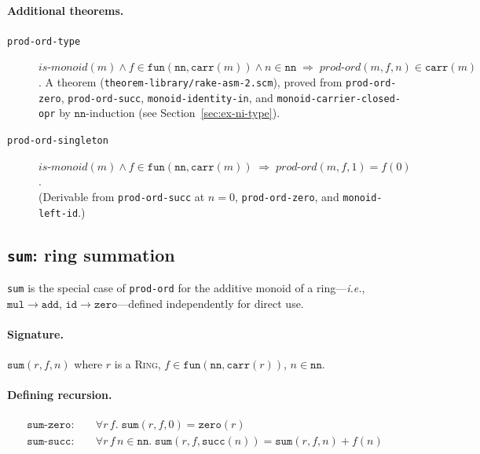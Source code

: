 \paragraph{Additional theorems.}
\begin{description}
\item[\texttt{prod-ord-type}]
  $\mathit{is\text{-}monoid}(m) \wedge f \in \mathtt{fun}(\mathtt{nn}, \mathtt{carr}(m))
  \wedge n \in \mathtt{nn} \;\Rightarrow\;
  \mathit{prod\text{-}ord}(m, f, n) \in \mathtt{carr}(m)$.
  A theorem (\texttt{theorem-library/rake-asm-2.scm}), proved from
  \texttt{prod-ord-zero}, \texttt{prod-ord-succ}, \texttt{monoid-identity-in},
  and \texttt{monoid-carrier-closed-opr} by $\mathtt{nn}$-induction
  (see Section~\ref{sec:ex-ni-type}).

\item[\texttt{prod-ord-singleton}]
  $\mathit{is\text{-}monoid}(m) \wedge f \in \mathtt{fun}(\mathtt{nn}, \mathtt{carr}(m))
  \;\Rightarrow\; \mathit{prod\text{-}ord}(m, f, 1) = f(0)$.\\
  (Derivable from \texttt{prod-ord-succ} at $n=0$, \texttt{prod-ord-zero},
  and \texttt{monoid-left-id}.)
\end{description}

\subsection{\texttt{sum}: ring summation}

\texttt{sum} is the special case of \texttt{prod-ord} for the additive
monoid of a ring---\textit{i.e.}, $\mathtt{mul} \to \mathtt{add}$,
$\mathtt{id} \to \mathtt{zero}$---defined independently for direct use.

\paragraph{Signature.}
$\mathtt{sum}(r, f, n)$ where $r$ is a \textsc{Ring},
$f \in \mathtt{fun}(\mathtt{nn}, \mathtt{carr}(r))$, $n \in \mathtt{nn}$.

\paragraph{Defining recursion.}

\begin{align*}
\mathtt{sum\text{-}zero}: &\quad
  \forall r\, f.\; \mathtt{sum}(r, f, 0) = \mathtt{zero}(r) \\
\mathtt{sum\text{-}succ}: &\quad
  \forall r\, f\, n \in \mathtt{nn}.\;
  \mathtt{sum}(r, f, \mathtt{succ}(n))
  = \mathtt{sum}(r, f, n) + f(n)
\end{align*}

